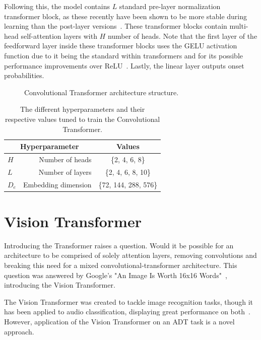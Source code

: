 Following this, the model contains $L$ standard pre-layer normalization transformer block, as these recently have been shown to be more stable during learning than the post-layer versions~\cite{pmlr-v119-xiong20b}. These transformer blocks contain multi-head self-attention layers with $H$ number of heads. Note that the first layer of the feedforward layer inside these transformer blocks uses the \gls{GELU} activation function due to it being the standard within transformers and for its possible performance improvements over \gls{ReLU}~\cite{devlin-etal-2019-bert, hendrycks2023gaussianerrorlinearunits}. Lastly, the linear layer outputs onset probabilities.

\begin{figure}[H]
    \centering
    
    \caption{Convolutional Transformer architecture structure.}
    \label{CTFigure}
\end{figure}

\begin{table}[H]
    \centering
    \begin{tabular}{lr|c}
        \multicolumn{2}{c|}{Hyperparameter} & Values       \\
        \hline
        $H$ & Number of heads     & \{2, 4, 6, 8\} \\
        $L$ & Number of layers      & \{2, 4, 6, 8, 10\} \\
        $D_e$ & Embedding dimension      & \{72, 144, 288, 576\} \\
    \end{tabular}
    \caption{The different hyperparameters and their respective values tuned to train the Convolutional Transformer.}
    \label{CTHyperparams}
\end{table}

\section{Vision Transformer}

Introducing the Transformer raises a question. Would it be possible for an architecture to be comprised of solely attention layers, removing convolutions and breaking this need for a mixed convolutional-transformer architecture. This question was answered by Google's "An Image Is Worth 16x16 Words"~\cite{dosovitskiy2021imageworth16x16words}, introducing the Vision Transformer.

The Vision Transformer was created to tackle image recognition tasks, though it has been applied to audio classification, displaying great performance on both~\cite{dosovitskiy2021imageworth16x16words, gong2021astaudiospectrogramtransformer}. However, application of the Vision Transformer on an \gls{ADT} task is a novel approach.

